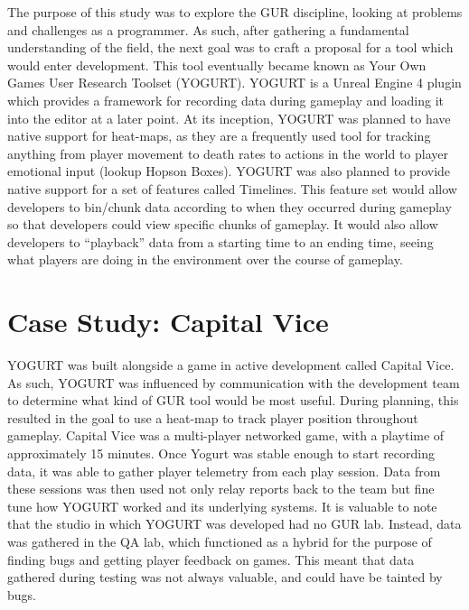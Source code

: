 \documentclass[journal]{IEEEtran}
\begin{document}
The purpose of this study was to explore the GUR discipline, looking at problems and challenges as a programmer. As such, after gathering a fundamental understanding of the field, the next goal was to craft a proposal for a tool which would enter development. This tool eventually became known as Your Own Games User Research Toolset (YOGURT). YOGURT is a Unreal Engine 4 plugin which provides a framework for recording data during gameplay and loading it into the editor at a later point.
At its inception, YOGURT was planned to have native support for heat-maps, as they are a frequently used tool for tracking anything from player movement to death rates to actions in the world to player emotional input (lookup Hopson Boxes). YOGURT was also planned to provide native support for a set of features called Timelines. This feature set would allow developers to bin/chunk data according to when they occurred during gameplay so that developers could view specific chunks of gameplay. It would also allow developers to “playback” data from a starting time to an ending time, seeing what players are doing in the environment over the course of gameplay.




\section{Case Study: Capital Vice}

YOGURT was built alongside a game in active development called Capital Vice. As such, YOGURT was influenced by communication with the development team to determine what kind of GUR tool would be most useful. During planning, this resulted in the goal to use a heat-map to track player position throughout gameplay. Capital Vice was a multi-player networked game, with a playtime of approximately 15 minutes. Once Yogurt was stable enough to start recording data, it was able to gather player telemetry from each play session. Data from these sessions was then used not only relay reports back to the team but fine tune how YOGURT worked and its underlying systems. It is valuable to note that the studio in which YOGURT was developed had no GUR lab. Instead, data was gathered in the QA lab, which functioned as a hybrid for the purpose of finding bugs and getting player feedback on games. This meant that data gathered during testing was not always valuable, and could have be tainted by bugs.
\end{document}
